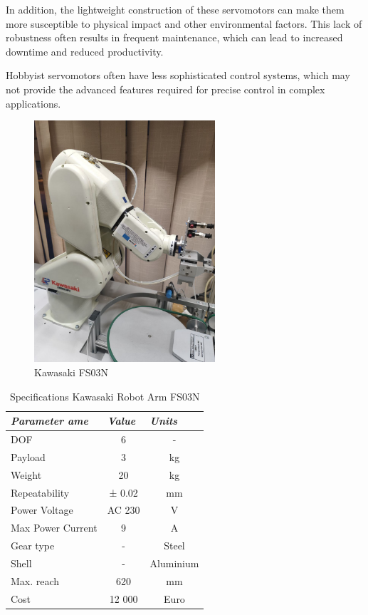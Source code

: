 In addition, the lightweight construction of these servomotors can make them more susceptible to physical impact and other environmental factors. This lack of robustness often results in frequent maintenance, which can lead to increased downtime and reduced productivity.

Hobbyist servomotors often have less sophisticated control systems, which may not provide the advanced features required for precise control in complex applications. 

 \begin{figure}[H]
	\centering
	\includegraphics[width=0.6\textwidth]{Src/images/FS03N.jpg}
	\caption{Kawasaki FS03N}
    \label{Kawasaki1}
\end{figure}

\begin{table}[H]
    \caption{Specifications Kawasaki Robot Arm FS03N}\label{tab:Kawasaki1}
    \centering
    \begin{tabular}{|l|c|c|}
        \hline
        \textit{\textbf{Parameter ame}} & \multicolumn{1}{l|}{\textit{\textbf{Value}}} & \multicolumn{1}{l|}{\textit{\textbf{Units}}} \\ \hline
        DOF                  & 6     & -     \\ \hline
        Payload              & 3 & kg    \\ \hline
        Weight               & 20   & kg    \\ \hline
        Repeatability        & ± 0.02 & mm    \\ \hline
        Power Voltage        & AC 230 & V     \\ \hline
        Max Power Current    & 9    & A     \\ \hline
        Gear type            & -     & Steel \\ \hline
        Shell                & -     & Aluminium \\ \hline
        Max. reach           & 620     & mm \\ \hline
        Cost                & 12 000     & Euro \\ \hline
        \end{tabular}
 \end{table}

